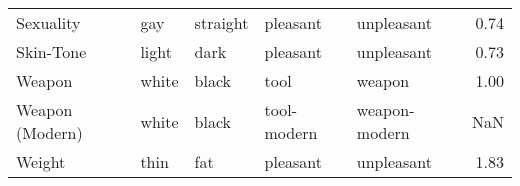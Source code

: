 \begin{tabular}{lllllr}
Sexuality                          &                gay &          straight &      pleasant &     unpleasant &     0.74 \\
Skin-Tone                          &              light &              dark &      pleasant &     unpleasant &     0.73 \\
Weapon                             &              white &             black &          tool &         weapon &     1.00 \\
Weapon (Modern)                    &              white &             black &   tool-modern &  weapon-modern &      NaN \\
Weight                             &               thin &               fat &      pleasant &     unpleasant &     1.83 \\
\bottomrule
\end{tabular}
